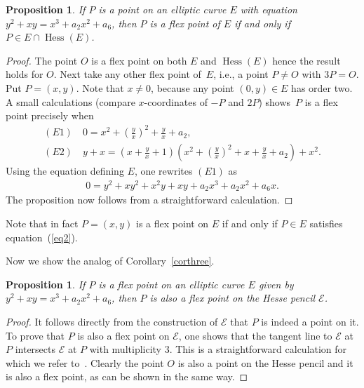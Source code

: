 \documentclass[pdftex]{sigma}
\numberwithin{equation}{section}
\newtheorem{Proposition}[Theorem]{Proposition}
\begin{document}
\begin{Proposition}\label{flexE} If $P$ is a point on an elliptic curve $E$ with equation $y^2+xy=x^3+a_2x^2+a_6$, then $P$ is a flex point of $E$ if and only if $P \in E \cap \operatorname{Hess}(E)$.
\end{Proposition}
\begin{proof}The point $O$ is a flex point on both $E$ and $\operatorname{Hess}(E)$ hence the result holds for $O$. Next take any other flex point of~$E$, i.e., a point $P\neq O$ with $3P=O$. Put $P=(x,y)$. Note that $x\neq 0$, because any point $(0,y)\in E$ has order two. A small calculations (compare $x$-coordinates of $-P$ and $2P$) shows~$P$ is a flex point precisely when
\begin{gather*}
 (E1)\quad 0=x^2 + \left(\frac{y}{x}\right)^2 + \frac{y}{x} + a_2, \\
 (E2)\quad y+x = \left(x + \frac{y}{x} + 1\right)\left(x^2 + \left(\frac{y}{x}\right)^2 + x + \frac{y}{x} + a_2\right) + x^2.
\end{gather*}
Using the equation defining $E$, one rewrites $(E1)$ as
\begin{gather} \label{eq2}
 0 = y^2+xy^2+x^2y+xy+a_2x^3+a_2x^2+a_6x.
\end{gather}
The proposition now follows from a straightforward calculation.
\end{proof}

Note that in fact $P=(x,y)$ is a flex point on $E$ if and only if $P\in E$ satisfies equation~(\ref{eq2}).

Now we show the analog of Corollary~\ref{corthree}.

\begin{Proposition}If $P$ is a flex point on an elliptic curve $E$ given by $y^2+xy=x^3+a_2x^2+a_6$, then $P$ is also a flex point on the Hesse pencil $\mathcal{E}$.
\end{Proposition}
\begin{proof}It follows directly from the construction of $\mathcal{E}$ that $P$ is indeed a point on it. To prove that $P$ is also a flex point on $\mathcal{E}$, one shows that the tangent line to $\mathcal{E}$ at $P$ intersects $\mathcal{E}$ at $P$ with multiplicity 3. This is a straightforward calculation for which we refer to~\cite{tuijp2015}. Clearly the point $O$ is also a point on the Hesse pencil and it is also a flex point, as can be shown in the same way.
\end{proof}
\end{document}
